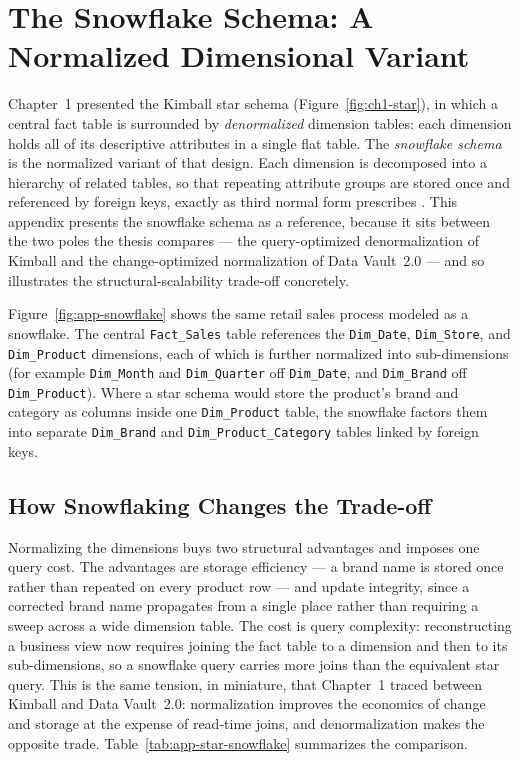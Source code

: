 \chapter{The Snowflake Schema: A Normalized Dimensional Variant}
\label{app:snowflake}

Chapter~1 presented the Kimball star schema (Figure~\ref{fig:ch1-star}), in which a central fact table is surrounded by \emph{denormalized} dimension tables: each dimension holds all of its descriptive attributes in a single flat table. The \emph{snowflake schema} is the normalized variant of that design. Each dimension is decomposed into a hierarchy of related tables, so that repeating attribute groups are stored once and referenced by foreign keys, exactly as third normal form prescribes \parencite{kimball2013}. This appendix presents the snowflake schema as a reference, because it sits between the two poles the thesis compares --- the query-optimized denormalization of Kimball and the change-optimized normalization of Data Vault~2.0 --- and so illustrates the structural-scalability trade-off concretely.


Figure~\ref{fig:app-snowflake} shows the same retail sales process modeled as a snowflake. The central \texttt{Fact\_Sales} table references the \texttt{Dim\_Date}, \texttt{Dim\_Store}, and \texttt{Dim\_Product} dimensions, each of which is further normalized into sub-dimensions (for example \texttt{Dim\_Month} and \texttt{Dim\_Quarter} off \texttt{Dim\_Date}, and \texttt{Dim\_Brand} off \texttt{Dim\_Product}). Where a star schema would store the product's brand and category as columns inside one \texttt{Dim\_Product} table, the snowflake factors them into separate \texttt{Dim\_Brand} and \texttt{Dim\_Product\_Category} tables linked by foreign keys.

\section*{How Snowflaking Changes the Trade-off}

Normalizing the dimensions buys two structural advantages and imposes one query cost. The advantages are storage efficiency --- a brand name is stored once rather than repeated on every product row --- and update integrity, since a corrected brand name propagates from a single place rather than requiring a sweep across a wide dimension table. The cost is query complexity: reconstructing a business view now requires joining the fact table to a dimension and then to its sub-dimensions, so a snowflake query carries more joins than the equivalent star query. This is the same tension, in miniature, that Chapter~1 traced between Kimball and Data Vault~2.0: normalization improves the economics of change and storage at the expense of read-time joins, and denormalization makes the opposite trade. Table~\ref{tab:app-star-snowflake} summarizes the comparison.

